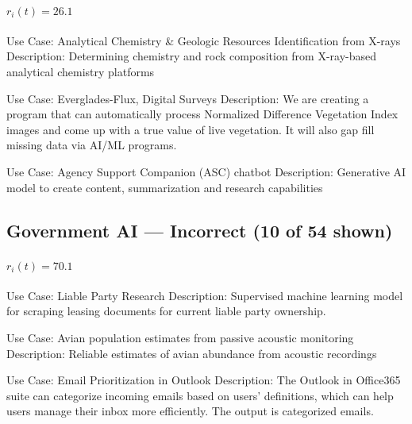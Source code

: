 \paragraph{$r_i(t) = 26.1$}
\begin{description}[style=nextline,leftmargin=1em,font=\normalfont\bfseries]
  \item[Anchor] Use Case: Analytical Chemistry \& Geologic Resources Identification from X-rays
Description:   Determining chemistry and rock composition from X-ray-based analytical chemistry platforms
  \item[Human-judged closer] Use Case: Everglades-Flux, Digital Surveys
Description: We are creating a program that can automatically process Normalized Difference Vegetation Index images and come up with a true value of live vegetation. It will also gap fill missing data via AI/ML programs.
  \item[Human-judged farther] Use Case: Agency Support Companion (ASC) chatbot
Description: Generative AI model to create content, summarization and research capabilities
\end{description}

\subsection{Government AI --- Incorrect (10 of 54 shown)}
\label{app:triplets-gov-ai-incorrect}

\paragraph{$r_i(t) = 70.1$}
\begin{description}[style=nextline,leftmargin=1em,font=\normalfont\bfseries]
  \item[Anchor] Use Case: Liable Party Research
Description: Supervised machine learning model for scraping leasing documents for current liable party ownership.
  \item[Human-judged closer] Use Case: Avian population estimates from passive acoustic monitoring
Description: Reliable estimates of avian abundance from acoustic recordings
  \item[Human-judged farther] Use Case: Email Prioritization in Outlook
Description: The Outlook in Office365 suite can categorize incoming emails based on users' definitions, which can help users manage their inbox more efficiently. The output is categorized emails.
\end{description}
